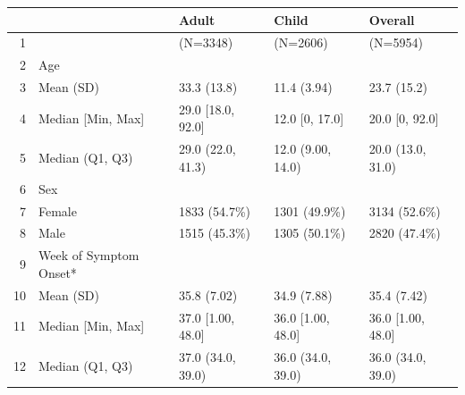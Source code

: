 \begin{table}[ht]
\centering
\begin{tabular}{rllll}
  \hline
 &   & Adult & Child & Overall \\ 
  \hline
1 &  & (N=3348) & (N=2606) & (N=5954) \\ 
  2 & Age &  &  &  \\ 
  3 &   Mean (SD) & 33.3 (13.8) & 11.4 (3.94) & 23.7 (15.2) \\ 
  4 &   Median [Min, Max] & 29.0 [18.0, 92.0] & 12.0 [0, 17.0] & 20.0 [0, 92.0] \\ 
  5 &   Median (Q1, Q3) & 29.0 (22.0, 41.3) & 12.0 (9.00, 14.0) & 20.0 (13.0, 31.0) \\ 
  6 & Sex &  &  &  \\ 
  7 &   Female & 1833 (54.7\%) & 1301 (49.9\%) & 3134 (52.6\%) \\ 
  8 &   Male & 1515 (45.3\%) & 1305 (50.1\%) & 2820 (47.4\%) \\ 
  9 & Week of Symptom Onset* &  &  &  \\ 
  10 &   Mean (SD) & 35.8 (7.02) & 34.9 (7.88) & 35.4 (7.42) \\ 
  11 &   Median [Min, Max] & 37.0 [1.00, 48.0] & 36.0 [1.00, 48.0] & 36.0 [1.00, 48.0] \\ 
  12 &   Median (Q1, Q3) & 37.0 (34.0, 39.0) & 36.0 (34.0, 39.0) & 36.0 (34.0, 39.0) \\ 
   \hline
\end{tabular}
\end{table}

